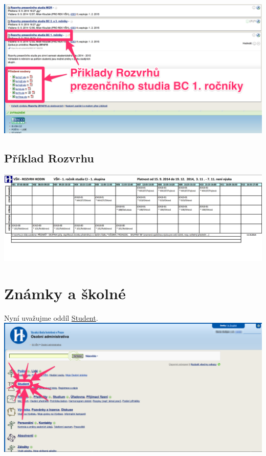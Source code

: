 \documentclass[a4paper,12pt]{article}
\begin{document}
\includegraphics[width=\textwidth]{s15-1}

	\subsection{Příklad Rozvrhu}

\includegraphics[width=\textwidth]{s16} \\

\newpage

\section{Známky a školné}

Nyní uvažujme oddíl \href{https://is.vsh.cz/auth/student/}{Student}. \\

\includegraphics[width=\textwidth]{s17} \\
\end{document}
